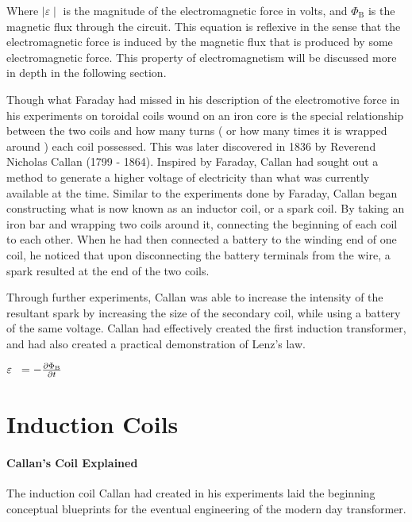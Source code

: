 \documentclass[12pt]{article}
\begin{document}
Where $\mid{\varepsilon}\mid$ is the magnitude of the electromagnetic force in volts, and $\Phi_\text{B}$ is the magnetic flux through the circuit. This equation is reflexive in the sense that the electromagnetic force is induced by the magnetic flux that is produced by some electromagnetic force. This property of electromagnetism will be discussed more in depth in the following section.


Though what Faraday had missed in his description of the electromotive force in his experiments on toroidal coils wound on an iron core is the special relationship between the two coils and how many turns ( or how many times it is wrapped around ) each coil possessed. This was later discovered in 1836 by Reverend Nicholas Callan (1799 - 1864). Inspired by Faraday, Callan had sought out a method to generate a higher voltage of electricity than what was currently available at the time. Similar to the experiments done by Faraday, Callan began constructing what is now known as an inductor coil, or a spark coil. By taking an iron bar and wrapping two coils around it, connecting the beginning of each coil to each other. When he had then connected a battery to the winding end of one coil, he noticed that upon disconnecting the battery terminals from the wire, a spark resulted at the end of the two coils.

Through further experiments, Callan was able to increase the intensity of the resultant spark by increasing the size of the secondary coil, while using a battery of the same voltage. Callan had effectively created the first induction transformer, and had also created a practical demonstration of Lenz's law.

\begin{center}
	\begin{huge}
		
		\vspace{5mm}
		${\varepsilon} \hspace{2mm }= -{{\partial\Phi_\text{B}} \over \partial t}$
		\vspace{5mm}	
	\end{huge}
\end{center}


\section{Induction Coils}
\paragraph{Callan's Coil Explained} 
The induction coil Callan had created in his experiments laid the beginning conceptual blueprints for the eventual engineering of the modern day transformer. 
\end{document}
